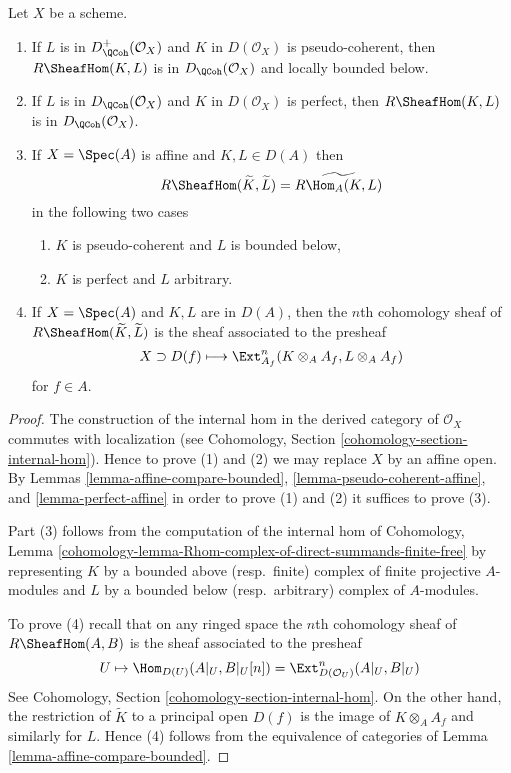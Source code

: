 \begin{lemma}
\label{lemma-quasi-coherence-internal-hom}
Let $X$ be a scheme.
\begin{enumerate}
\item If $L$ is in $D^+_\QCoh(\mathcal{O}_X)$ and
$K$ in $D(\mathcal{O}_X)$ is pseudo-coherent, then
$R\SheafHom(K, L)$ is in $D_\QCoh(\mathcal{O}_X)$
and locally bounded below.
\item If $L$ is in $D_\QCoh(\mathcal{O}_X)$ and
$K$ in $D(\mathcal{O}_X)$ is perfect, then
$R\SheafHom(K, L)$ is in $D_\QCoh(\mathcal{O}_X)$.
\item If $X = \Spec(A)$ is affine and $K, L \in D(A)$ then
$$
R\SheafHom(\widetilde{K}, \widetilde{L}) = \widetilde{R\Hom_A(K, L)}
$$
in the following two cases
\begin{enumerate}
\item $K$ is pseudo-coherent and $L$ is bounded below,
\item $K$ is perfect and $L$ arbitrary.
\end{enumerate}
\item If $X = \Spec(A)$ and $K, L$ are in $D(A)$, then the $n$th
cohomology sheaf of $R\SheafHom(\widetilde{K}, \widetilde{L})$
is the sheaf associated to the presheaf
$$
X \supset D(f) \longmapsto \Ext^n_{A_f}(K \otimes_A A_f, L \otimes_A A_f)
$$
for $f \in A$.
\end{enumerate}
\end{lemma}

\begin{proof}
The construction of the internal hom in the derived category of
$\mathcal{O}_X$ commutes with localization (see
Cohomology, Section \ref{cohomology-section-internal-hom}).
Hence to prove (1) and (2) we may replace $X$ by an affine open.
By Lemmas \ref{lemma-affine-compare-bounded},
\ref{lemma-pseudo-coherent-affine}, and
\ref{lemma-perfect-affine}
in order to prove (1) and (2) it suffices to prove (3).

\medskip\noindent
Part (3) follows from the computation of the
internal hom of Cohomology, Lemma
\ref{cohomology-lemma-Rhom-complex-of-direct-summands-finite-free}
by representing $K$ by a bounded above (resp.\ finite) complex of
finite projective $A$-modules and $L$ by a bounded below
(resp.\ arbitrary) complex of $A$-modules.

\medskip\noindent
To prove (4) recall that on any ringed space the $n$th cohomology sheaf of
$R\SheafHom(A, B)$ is the sheaf associated to the presheaf
$$
U \mapsto \Hom_{D(U)}(A|_U, B|_U[n]) =
\Ext^n_{D(\mathcal{O}_U)}(A|_U, B|_U)
$$
See Cohomology, Section \ref{cohomology-section-internal-hom}.
On the other hand, the restriction of $\widetilde{K}$ to a principal
open $D(f)$ is the image of $K \otimes_A A_f$ and similarly for $L$.
Hence (4) follows from the equivalence of categories of
Lemma \ref{lemma-affine-compare-bounded}.
\end{proof}

